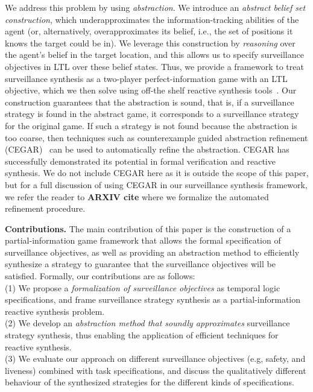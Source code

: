 We address this problem by using \emph{abstraction}. We introduce an \emph{abstract belief set construction}, which underapproximates the information-tracking abilities of the agent (or, alternatively, overapproximates its belief, i.e., the set of positions it knows the target could be in). We leverage this construction by \emph{reasoning} over the agent's belief in the target location, and this allows us to specify surveillance objectives in LTL over these belief states. Thus, we provide a framework to treat surveillance synthesis as a two-player perfect-information game with an LTL objective, which we then solve using off-the shelf reactive synthesis tools~\cite{EhlersR16}. Our construction guarantees that the abstraction is sound, that is, if a surveillance strategy is found in the abstract game, it corresponds to a surveillance strategy for the original game. If such a strategy is not found because the abstraction is too coarse, then techniques such as counterexample guided abstraction refinement (CEGAR)~\cite{ClarkeGJLV00} can be used to automatically refine the abstraction. CEGAR has successfully demonstrated its potential in formal verification and reactive synthesis. We do not include CEGAR here as it is outside the scope of this paper, but for a full discussion of using CEGAR in our surveillance synthesis framework, we refer the reader to \textbf{ARXIV cite} where we formalize the automated refinement procedure.


{\bf Contributions.} The main contribution of this paper is the construction of a partial-information game framework that allows the formal specification of surveillance objectives, as well as providing an abstraction method to efficiently synthesize a strategy to guarantee that the surveillance objectives will be satisfied. Formally, our contributions are as follows:\\
(1) We propose a \emph{formalization of surveillance objectives} as temporal logic specifications, and frame surveillance strategy synthesis  as a partial-information reactive synthesis problem.\\
(2) We develop an \emph{abstraction method that soundly approximates} surveillance strategy synthesis, thus enabling the application of efficient techniques for reactive synthesis.\\
(3) We evaluate our approach on different surveillance objectives (e.g, safety, and liveness) combined with task specifications, and discuss the qualitatively different behaviour of the synthesized strategies for the different kinds of specifications.

